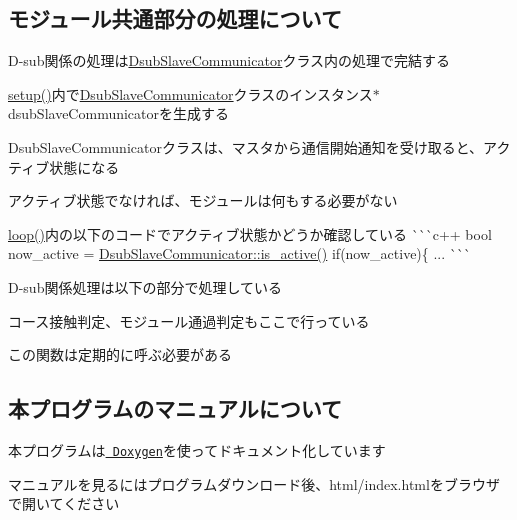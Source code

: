\subsection*{モジュール共通部分の処理について}


\begin{DoxyItemize}
\item D-\/sub関係の処理は{\ttfamily \mbox{\hyperlink{class_dsub_slave_communicator}{Dsub\+Slave\+Communicator}}}クラス内の処理で完結する
\item {\ttfamily \mbox{\hyperlink{iraira__bo__gear__mod_8ino_a7dfd9b79bc5a37d7df40207afbc5431f}{setup()}}}内で{\ttfamily \mbox{\hyperlink{class_dsub_slave_communicator}{Dsub\+Slave\+Communicator}}}クラスのインスタンス{\ttfamily $\ast$dsub\+Slave\+Communicator}を生成する
\item Dsub\+Slave\+Communicatorクラスは、マスタから通信開始通知を受け取ると、アクティブ状態になる
\item アクティブ状態でなければ、モジュールは何もする必要がない
\begin{DoxyItemize}
\item {\ttfamily \mbox{\hyperlink{iraira__bo__gear__mod_8ino_a0b33edabd7f1c4e4a0bf32c67269be2f}{loop()}}}内の以下のコードでアクティブ状態かどうか確認している \`{}\`{}\`{}c++ bool now\+\_\+active = \mbox{\hyperlink{class_dsub_slave_communicator_a7a7d6e43b95833e698761442b0741e72}{Dsub\+Slave\+Communicator\+::is\+\_\+active()}} if(now\+\_\+active)\{ ... \`{}\`{}\`{}
\end{DoxyItemize}
\item D-\/sub関係処理は以下の部分で処理している 
\begin{DoxyCode}{0}
\end{DoxyCode}

\begin{DoxyItemize}
\item コース接触判定、モジュール通過判定もここで行っている
\item この関数は定期的に呼ぶ必要がある
\end{DoxyItemize}
\end{DoxyItemize}

\subsection*{本プログラムのマニュアルについて}


\begin{DoxyItemize}
\item 本プログラムは\href{http://www.doxygen.nl/index.html}{\texttt{ Doxygen}}を使ってドキュメント化しています
\item マニュアルを見るにはプログラムダウンロード後、html/index.htmlをブラウザで開いてください 
\end{DoxyItemize}